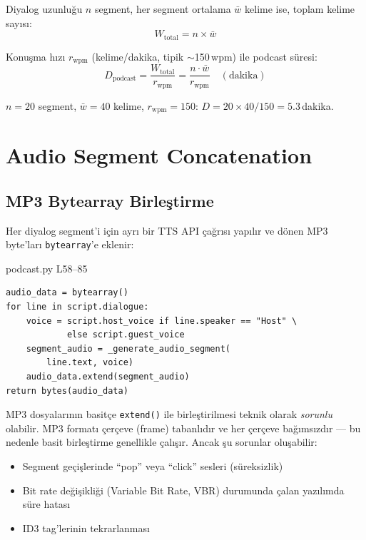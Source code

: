 Diyalog uzunlu\u{g}u $n$ segment, her segment ortalama $\bar{w}$ kelime ise, toplam kelime say{\i}s{\i}:
\begin{equation}
\label{eq:dialogue_length}
W_{\text{total}} = n \times \bar{w}
\end{equation}

Konu\c{s}ma h{\i}z{\i} $r_{\text{wpm}}$ (kelime/dakika, tipik $\sim$150\,wpm) ile podcast s\"{u}resi:
\begin{equation}
\label{eq:podcast_duration}
D_{\text{podcast}} = \frac{W_{\text{total}}}{r_{\text{wpm}}} = \frac{n \cdot \bar{w}}{r_{\text{wpm}}} \quad (\text{dakika})
\end{equation}

\begin{ornek}
$n = 20$ segment, $\bar{w} = 40$ kelime, $r_{\text{wpm}} = 150$:
$D = 20 \times 40 / 150 = 5.3$\,dakika.
\end{ornek}


\section{Audio Segment Concatenation}
\label{sec:audio_concat}

\subsection{MP3 Bytearray Birle\c{s}tirme}

Her diyalog segment'i i\c{c}in ayr{\i} bir TTS API \c{c}a\u{g}r{\i}s{\i} yap{\i}l{\i}r ve d\"{o}nen MP3 byte'lar{\i} \texttt{bytearray}'e eklenir:

\begin{kodref}{podcast.py L58--85}
\begin{lstlisting}[caption={Audio segment birle\c{s}tirme}]
audio_data = bytearray()
for line in script.dialogue:
    voice = script.host_voice if line.speaker == "Host" \
            else script.guest_voice
    segment_audio = _generate_audio_segment(
        line.text, voice)
    audio_data.extend(segment_audio)
return bytes(audio_data)
\end{lstlisting}
\end{kodref}

\begin{dikkat}
MP3 dosyalar{\i}n{\i}n basit\c{c}e \texttt{extend()} ile birle\c{s}tirilmesi teknik olarak \emph{sorunlu} olabilir. MP3 format{\i} \c{c}er\c{c}eve (frame) tabanl{\i}d{\i}r ve her \c{c}er\c{c}eve ba\u{g}{\i}ms{\i}zd{\i}r --- bu nedenle basit birle\c{s}tirme genellikle \c{c}al{\i}\c{s}{\i}r. Ancak \c{s}u sorunlar olu\c{s}abilir:
\begin{itemize}
  \item Segment ge\c{c}i\c{s}lerinde ``pop'' veya ``click'' sesleri (s\"{u}reksizlik)
  \item Bit rate de\u{g}i\c{s}ikli\u{g}i (Variable Bit Rate, VBR) durumunda \c{c}alan yazılımda s\"{u}re hatas{\i}
  \item ID3 tag'lerinin tekrarlanmas{\i}
\end{itemize}
\end{dikkat}

